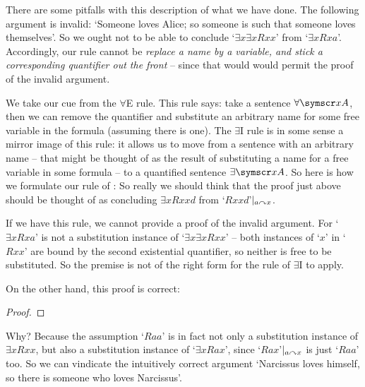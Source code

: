There are some pitfalls with this description of what we have done. The following argument is invalid: `Someone loves Alice; so someone is such that someone loves themselves'. So we ought not to be able to conclude `$\exists x \exists x Rxx$' from `$\exists x Rxa$'. Accordingly, our rule cannot be \emph{replace a name by a variable, and stick a corresponding quantifier out the front} – since that would would permit the proof of the invalid argument.

We take our cue from the $\forall$E rule. This rule says: take a sentence $\forall\meta{xA}$, then we can remove the quantifier and substitute an arbitrary name for some free variable in the formula  (assuming there is one). The $\exists$I rule is in some sense a mirror image of this rule: it allows us to move from a sentence with an arbitrary name – that might be thought of as the result of substituting a name for a free variable in some formula  – to a quantified sentence $\exists \meta{xA}$. So here is how we formulate our rule of :
 So really we should think that the proof just above should be thought of as concluding $\exists x Rxxd$ from `$Rxxd$'$\vert_{a\curvearrowright x}$.

If we have this rule, we cannot provide a proof of the invalid argument. For `$\exists x Rxa$' is not a substitution instance of `$\exists x \exists x Rxx$' – both instances of `$x$' in `$Rxx$' are bound by the second existential quantifier, so neither is free to be substituted. So the premise is not of the right form for the rule of $\exists$I to apply. 

On the other hand, this proof is correct:
\begin{proof}
\end{proof} Why? Because the assumption `$Raa$' is in fact not only a substitution instance of $\exists x Rxx$, but also a substitution instance of `$\exists x Rax$', since `$Rax$'$\vert_{a\curvearrowright x}$ is just `$Raa$' too. So we can vindicate the intuitively correct argument `Narcissus loves himself, so there is someone who loves Narcissus'. 

